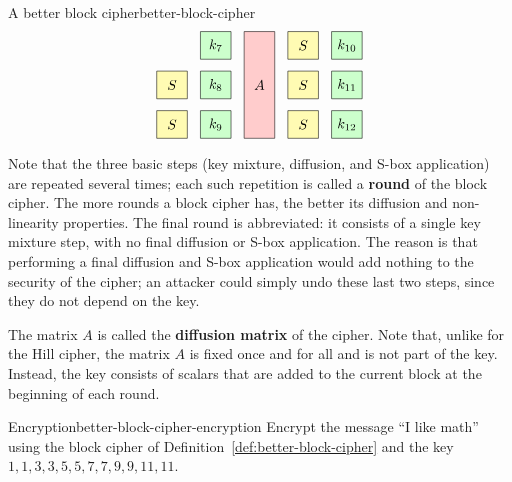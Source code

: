\begin{definition}{A better block cipher}{better-block-cipher}
\begin{equation*}
\begin{tikzpicture}[xscale=1.1,
      a/.style={fill=red!20},
      s/.style={fill=yellow!30},
      k/.style={fill=green!20}]
      \draw[s] (6,1) +(-0.35,-0.35) rectangle node{$S$} +(0.35,0.35);
      \draw[s] (6,0) +(-0.35,-0.35) rectangle node{$S$} +(0.35,0.35);
      \draw[k] (7,2) +(-0.35,-0.35) rectangle node{$k_{7}$} +(0.35,0.35);
      \draw[k] (7,1) +(-0.35,-0.35) rectangle node{$k_{8}$} +(0.35,0.35);
      \draw[k] (7,0) +(-0.35,-0.35) rectangle node{$k_{9}$} +(0.35,0.35);
      \draw[a] (8,0) +(-0.35,-0.35) rectangle node{$A$} +(0.35,2.35);
      \draw[s] (9,2) +(-0.35,-0.35) rectangle node{$S$} +(0.35,0.35);
      \draw[s] (9,1) +(-0.35,-0.35) rectangle node{$S$} +(0.35,0.35);
      \draw[s] (9,0) +(-0.35,-0.35) rectangle node{$S$} +(0.35,0.35);
      \draw[k] (10,2) +(-0.35,-0.35) rectangle node{$k_{10}$} +(0.35,0.35);
      \draw[k] (10,1) +(-0.35,-0.35) rectangle node{$k_{11}$} +(0.35,0.35);
      \draw[k] (10,0) +(-0.35,-0.35) rectangle node{$k_{12}$} +(0.35,0.35);
  \end{tikzpicture}
\end{equation*}
\end{definition}

Note that the three basic steps (key mixture, diffusion, and S-box
application) are repeated several times; each such repetition is
called a \textbf{round}%
 of the block cipher.  The more rounds
a block cipher has, the better its diffusion and non-linearity
properties. The final round is abbreviated: it consists of a single
key mixture step, with no final diffusion or S-box application. The
reason is that performing a final diffusion and S-box application
would add nothing to the security of the cipher; an attacker could
simply undo these last two steps, since they do not depend on the key.

The matrix $A$ is called the \textbf{diffusion matrix}%
%
 of the cipher. Note that, unlike for
the Hill cipher, the matrix $A$ is fixed once and for all and is not
part of the key. Instead, the key consists of scalars that are added
to the current block at the beginning of each round.

\begin{example}{Encryption}{better-block-cipher-encryption}
  Encrypt the message ``I like math'' using the block cipher of
  Definition~\ref{def:better-block-cipher} and the key $1,1,3,3,5,5,7,7,9,9,11,11$.
\end{example}


